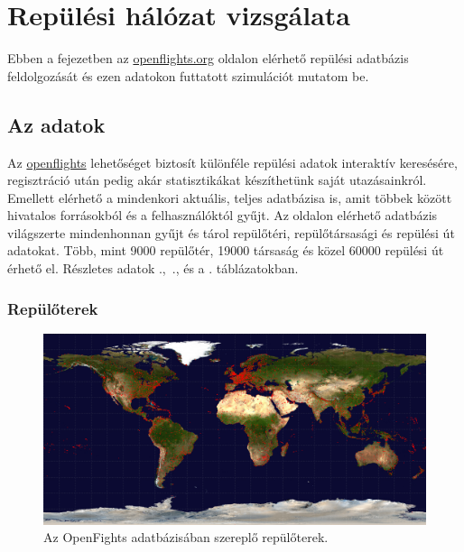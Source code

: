 \chapter{Repülési hálózat vizsgálata}\label{test}
Ebben a fejezetben az \href{http://openflights.org/}{openflights.org} oldalon elérhető repülési adatbázis feldolgozását és ezen adatokon futtatott szimulációt mutatom be.

  \section{Az adatok}
  Az \href{http://openflights.org/}{openflights} lehetőséget biztosít különféle repülési adatok interaktív keresésére, regisztráció után pedig akár statisztikákat készíthetünk saját utazásainkról. Emellett elérhető a mindenkori aktuális, teljes adatbázisa is, amit többek között hivatalos forrásokból és a felhasználóktól gyűjt.
  Az oldalon elérhető adatbázis világszerte mindenhonnan gyűjt és tárol repülőtéri, repülőtársasági és repülési út adatokat. Több, mint 9000 repülőtér, 19000 társaság és közel 60000 repülési út érhető el. Részletes adatok .,~., és a . táblázatokban.

    \subsection{Repülőterek}
    \begin{figure}[!ht]
      \centering
      \includegraphics[width=150mm,keepaspectratio=true]{./figures/airports-2048.png}
      \caption{Az OpenFights adatbázisában szereplő repülőterek.}
      \label{fig:figure_repterek}
    \end{figure}

